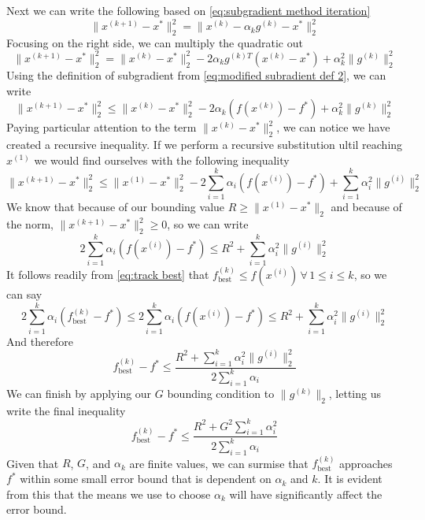 \documentclass[journal,onecolumn]{IEEEtran}
\DeclareMathOperator{\best}{best}
\let\oldforall\forall
\renewcommand{\forall}{ \, \oldforall \, }
\begin{document}
Next we can write the following based on \eqref{eq:subgradient method iteration}
\begin{equation}
\|x^{(k+1)}-x^*\|^2_2 = \|x^{(k)} - \alpha_k g^{(k)}-x^*\|^2_2
\end{equation}
Focusing on the right side, we can multiply the quadratic out
\begin{equation}
\|x^{(k+1)}-x^*\|^2_2= \|x^{(k)}-x^*\|^2_2 - 2\alpha_k g^{(k)T}(x^{(k)}-x^*) + \alpha^2_k \|g^{(k)}\|^2_2
\end{equation}
Using the definition of subgradient from \eqref{eq:modified subradient def 2}, we can write
\begin{equation}
\|x^{(k+1)}-x^*\|^2_2 \leq \|x^{(k)}-x^*\|^2_2 - 2\alpha_k (f(x^{(k)})-f^*) + \alpha^2_k \|g^{(k)}\|^2_2
\end{equation}
Paying particular attention to the term \(\|x^{(k)}-x^*\|^2_2\), we can notice we have created a recursive inequality. If we perform a recursive substitution ultil reaching \(x^{(1)}\) we would find ourselves with the following inequality
\begin{equation}
\|x^{(k+1)}-x^*\|^2_2 \leq \|x^{(1)}-x^*\|^2_2 - 2\sum^k_{i=1}\alpha_i (f(x^{(i)})-f^*) + \sum^k_{i=1}\alpha^2_i\|g^{(i)}\|^2_2
\end{equation}
We know that because of our bounding value \(R \geq \|x^{(1)}-x^*\|_2\) and because of the norm, \(\|x^{(k+1)}-x^*\|^2_2 \geq 0\), so we can write
\begin{equation}
    2\sum^k_{i=1}\alpha_i (f(x^{(i)})-f^*) \leq R^2  + \sum^k_{i=1}\alpha^2_i\|g^{(i)}\|^2_2
\end{equation}
It follows readily from \eqref{eq:track best} that \(f^{(k)}_{\best} \leq f(x^{(i)}) \forall 1 \leq i \leq k\), so we can say
\begin{equation}
    2\sum^k_{i=1}\alpha_i (f^{(k)}_{\best}-f^*) \leq 2\sum^k_{i=1}\alpha_i (f(x^{(i)})-f^*) \leq R^2  + \sum^k_{i=1}\alpha^2_i\|g^{(i)}\|^2_2
\end{equation}
And therefore
\begin{equation}\label{eq:general bound}
    f^{(k)}_{\best}-f^* \leq \frac{R^2  + \sum^k_{i=1}\alpha^2_i\|g^{(i)}\|^2_2}{2\sum^k_{i=1}\alpha_i}
\end{equation}
We can finish by applying our \(G\) bounding condition to \(\|g^{(k)}\|_2\), letting us write the final inequality
\begin{equation}\label{eq:maximum bound}
    f^{(k)}_{\best}-f^* \leq \frac{R^2  + G^2 \sum^k_{i=1}\alpha^2_i}{2\sum^k_{i=1}\alpha_i}
\end{equation}
Given that \(R\), \(G\), and \(\alpha_k\) are finite values, we can surmise that \(f^{(k)}_{\best}\) approaches \(f^*\) within some small error bound that is dependent on \(\alpha_k\) and \(k\). It is evident from this that the means we use to choose \(\alpha_k\) will have significantly affect the error bound.
\end{document}
